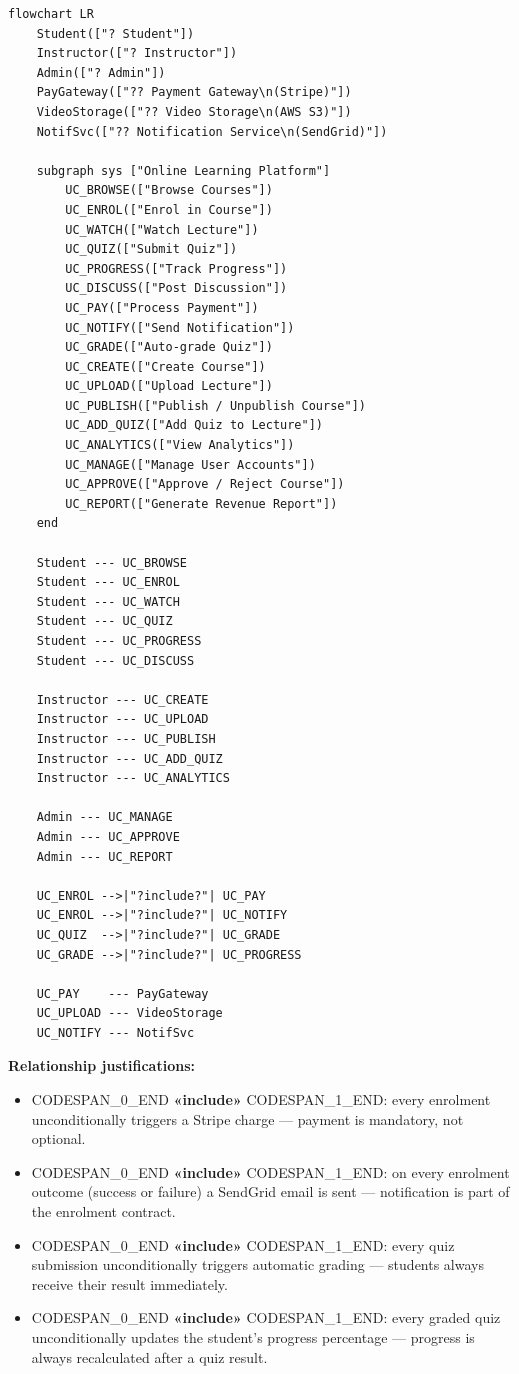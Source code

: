 \documentclass[11pt,a4paper]{book}
\begin{document}
\begin{lstlisting}
flowchart LR
    Student(["? Student"])
    Instructor(["? Instructor"])
    Admin(["? Admin"])
    PayGateway(["?? Payment Gateway\n(Stripe)"])
    VideoStorage(["?? Video Storage\n(AWS S3)"])
    NotifSvc(["?? Notification Service\n(SendGrid)"])

    subgraph sys ["Online Learning Platform"]
        UC_BROWSE(["Browse Courses"])
        UC_ENROL(["Enrol in Course"])
        UC_WATCH(["Watch Lecture"])
        UC_QUIZ(["Submit Quiz"])
        UC_PROGRESS(["Track Progress"])
        UC_DISCUSS(["Post Discussion"])
        UC_PAY(["Process Payment"])
        UC_NOTIFY(["Send Notification"])
        UC_GRADE(["Auto-grade Quiz"])
        UC_CREATE(["Create Course"])
        UC_UPLOAD(["Upload Lecture"])
        UC_PUBLISH(["Publish / Unpublish Course"])
        UC_ADD_QUIZ(["Add Quiz to Lecture"])
        UC_ANALYTICS(["View Analytics"])
        UC_MANAGE(["Manage User Accounts"])
        UC_APPROVE(["Approve / Reject Course"])
        UC_REPORT(["Generate Revenue Report"])
    end

    Student --- UC_BROWSE
    Student --- UC_ENROL
    Student --- UC_WATCH
    Student --- UC_QUIZ
    Student --- UC_PROGRESS
    Student --- UC_DISCUSS

    Instructor --- UC_CREATE
    Instructor --- UC_UPLOAD
    Instructor --- UC_PUBLISH
    Instructor --- UC_ADD_QUIZ
    Instructor --- UC_ANALYTICS

    Admin --- UC_MANAGE
    Admin --- UC_APPROVE
    Admin --- UC_REPORT

    UC_ENROL -->|"?include?"| UC_PAY
    UC_ENROL -->|"?include?"| UC_NOTIFY
    UC_QUIZ  -->|"?include?"| UC_GRADE
    UC_GRADE -->|"?include?"| UC_PROGRESS

    UC_PAY    --- PayGateway
    UC_UPLOAD --- VideoStorage
    UC_NOTIFY --- NotifSvc
\end{lstlisting}

\textbf{Relationship justifications:}
\begin{itemize}
  \item CODESPAN\_0\_END \textbf{«include»} CODESPAN\_1\_END: every enrolment unconditionally triggers a Stripe charge --- payment is mandatory, not optional.
  \item CODESPAN\_0\_END \textbf{«include»} CODESPAN\_1\_END: on every enrolment outcome (success or failure) a SendGrid email is sent --- notification is part of the enrolment contract.
  \item CODESPAN\_0\_END \textbf{«include»} CODESPAN\_1\_END: every quiz submission unconditionally triggers automatic grading --- students always receive their result immediately.
  \item CODESPAN\_0\_END \textbf{«include»} CODESPAN\_1\_END: every graded quiz unconditionally updates the student's progress percentage --- progress is always recalculated after a quiz result.
\end{itemize}
\end{document}
